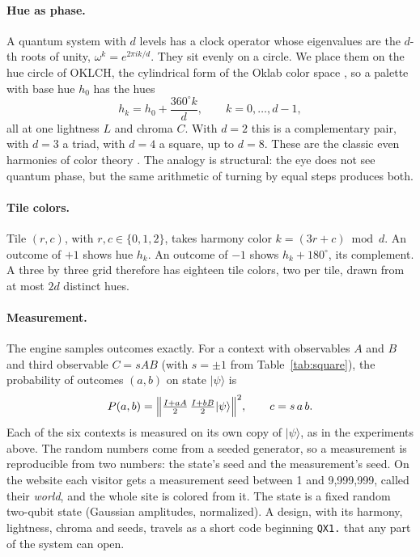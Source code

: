 \documentclass[11pt,a4paper]{article}
\newcommand{\ket}[1]{\lvert #1\rangle}
\theoremstyle{qresult}
\begin{document}
\paragraph{Hue as phase.} A quantum system with $d$ levels has a clock operator whose eigenvalues are the $d$-th roots
of unity, $\omega^k = e^{2\pi i k/d}$. They sit evenly on a circle. We place them on the hue circle of OKLCH, the
cylindrical form of the Oklab color space \citep{ottosson2020,csscolor4}, so a palette with base hue $h_0$ has the
hues
\begin{equation}
  h_k = h_0 + \frac{360^\circ k}{d}, \qquad k = 0, \dots, d-1,
\end{equation}
all at one lightness $L$ and chroma $C$. With $d=2$ this is a complementary pair, with $d=3$ a triad, with $d=4$ a
square, up to $d=8$. These are the classic even harmonies of color theory \citep{itten1961}. The analogy is
structural: the eye does not see quantum phase, but the same arithmetic of turning by equal steps produces both.

\paragraph{Tile colors.} Tile $(r,c)$, with $r,c \in \{0,1,2\}$, takes harmony color $k = (3r+c) \bmod d$. An outcome
of $+1$ shows hue $h_k$. An outcome of $-1$ shows $h_k + 180^\circ$, its complement. A three by three grid therefore
has eighteen tile colors, two per tile, drawn from at most $2d$ distinct hues.

\paragraph{Measurement.} The engine samples outcomes exactly. For a context with observables $A$ and $B$ and third
observable $C = sAB$ (with $s = \pm1$ from Table~\ref{tab:square}), the probability of outcomes $(a,b)$ on state
$\ket\psi$ is
\begin{equation}
  P(a,b) = \Bigl\lVert \tfrac{I+aA}{2}\,\tfrac{I+bB}{2}\ket\psi \Bigr\rVert^2, \qquad c = s\,a\,b .
\end{equation}
Each of the six contexts is measured on its own copy of $\ket\psi$, as in the experiments above. The random numbers
come from a seeded generator, so a measurement is reproducible from two numbers: the state's seed and the
measurement's seed. On the website each visitor gets a measurement seed between 1 and 9{,}999{,}999, called their
\emph{world}, and the whole site is colored from it. The state is a fixed random two-qubit state (Gaussian
amplitudes, normalized). A design, with its harmony, lightness, chroma and seeds, travels as a short code beginning
\texttt{QX1.} that any part of the system can open.
\end{document}
